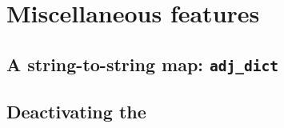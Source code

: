 \chapter{Miscellaneous features}
\section{A string-to-string map: \texttt{adj_dict}} \label{api:adj_dict} 

\section{Deactivating the \adjointer}
